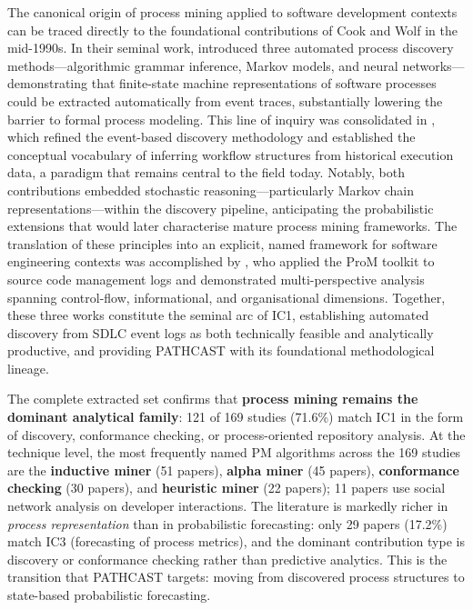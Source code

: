 The canonical origin of process mining applied to software development contexts
can be traced directly to the foundational contributions of Cook and Wolf in the
mid-1990s. In their seminal work, \cite{cook1995} introduced three automated
process discovery methods---algorithmic grammar inference, Markov models, and
neural networks---demonstrating that finite-state machine representations of
software processes could be extracted automatically from event traces,
substantially lowering the barrier to formal process modeling. This line of
inquiry was consolidated in \cite{cook1998}, which refined the event-based
discovery methodology and established the conceptual vocabulary of inferring
workflow structures from historical execution data, a paradigm that remains
central to the field today. Notably, both contributions embedded stochastic
reasoning---particularly Markov chain representations---within the discovery
pipeline, anticipating the probabilistic extensions that would later characterise
mature process mining frameworks. The translation of these principles into an
explicit, named framework for software engineering contexts was accomplished by
\cite{rubin2007}, who applied the ProM toolkit to source code management logs
and demonstrated multi-perspective analysis spanning control-flow, informational,
and organisational dimensions. Together, these three works constitute the seminal
arc of IC1, establishing automated discovery from SDLC event logs as both
technically feasible and analytically productive, and providing PATHCAST with
its foundational methodological lineage.

The complete extracted set confirms that \textbf{process mining remains the
dominant analytical family}: 121 of 169 studies (71.6\%) match IC1 in the
form of discovery, conformance checking, or process-oriented repository
analysis. At the technique level, the most frequently named PM algorithms
across the 169 studies are the \textbf{inductive miner} (51 papers),
\textbf{alpha miner} (45 papers), \textbf{conformance checking} (30 papers),
and \textbf{heuristic miner} (22 papers); 11 papers use social network
analysis on developer interactions. The literature is markedly richer in
\emph{process representation} than in probabilistic forecasting: only 29
papers (17.2\%) match IC3 (forecasting of process metrics), and the dominant
contribution type is discovery or conformance checking rather than predictive
analytics. This is the transition that PATHCAST targets: moving from
discovered process structures to state-based probabilistic forecasting.

